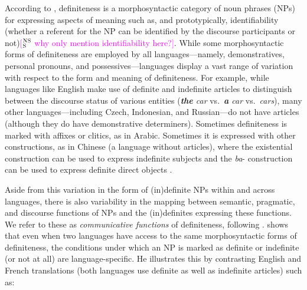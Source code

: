 \documentclass[11pt,letterpaper]{article}
\newcommand{\ensuretext}[1]{#1}
\newcommand{\nssmarker}{\ensuretext{\textcolor{magenta}{\ensuremath{^{\textsc{NS}}_{\textsc{S}}}}}}
\newcommand{\arkcomment}[3]{\ensuretext{\textcolor{#3}{[#1 #2]}}}
\newcommand{\nss}[1]{\arkcomment{\nssmarker}{#1}{magenta}}
\newcommand{\llbl}[1]{\mbox{\textsc{#1}}} %
\begin{document}
According to \cite{lyons99}, definiteness is a morphosyntactic category of noun phrases (NPs) 
for expressing aspects of meaning such as, and prototypically, identifiability 
(whether a referent for the NP can be identified by the discourse participants or not)\nss{why only mention identifiability here?}. 
While some morphosyntactic forms of definiteness are employed by all languages---namely, 
demonstratives, personal pronouns, and possessives---languages display a vast range of variation with respect to 
the form and meaning of definiteness. 
For example, while languages like English make use of definite and indefinite articles 
to distinguish between the discourse status of various entities ({\it \textbf{the} car} vs.~{\it \textbf{a} car} vs.~{\it cars}), 
many other languages---including Czech, Indonesian, and Russian---do not have articles
(although they do have demonstrative determiners).  
Sometimes definiteness is marked with affixes or clitics, as in Arabic. Sometimes it is expressed with other constructions,
as in Chinese (a language without articles), where the existential construction can be used to express indefinite subjects 
and the {\it ba}- construction can be used to express definite direct objects \citep{chen04}. 

Aside from this variation in the form of (in)definite NPs within and across languages, there is also variability 
in the mapping between semantic, pragmatic, and discourse %
functions of NPs and the (in)definites expressing these functions.   
We refer to these as {\em communicative functions} of definiteness, following \cite{bhatia14}.  
 shows that even when two languages have access to the same morphosyntactic forms of definiteness, the conditions under which an NP 
is marked as definite or indefinite (or not at all) 
are language-specific. He illustrates this by contrasting English and French translations (both languages use definite as well as indefinite articles) such as:
\end{document}
